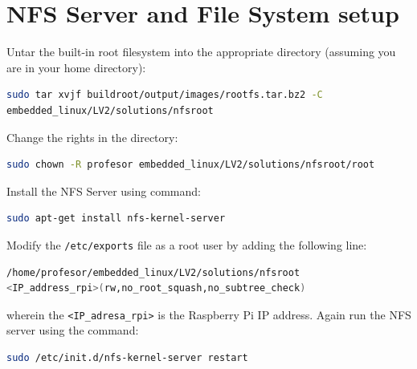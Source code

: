 \documentclass[11pt]{article}
\begin{document}
\section{NFS Server and File System setup}
Untar the built-in root filesystem into the appropriate directory (assuming you
 are in your home directory):
\begin{lstlisting}[language=bash]
sudo tar xvjf buildroot/output/images/rootfs.tar.bz2 -C
embedded_linux/LV2/solutions/nfsroot
\end{lstlisting}
Change the rights in the directory:
\begin{lstlisting}[language=bash]
sudo chown -R profesor embedded_linux/LV2/solutions/nfsroot/root
\end{lstlisting}
Install the NFS Server using command:
\begin{lstlisting}[language=bash]
sudo apt-get install nfs-kernel-server
\end{lstlisting}
Modify the \texttt{/etc/exports} file as a root user by adding the following
 line:
\begin{lstlisting}[language=bash]
/home/profesor/embedded_linux/LV2/solutions/nfsroot
<IP_address_rpi>(rw,no_root_squash,no_subtree_check)
\end{lstlisting}
wherein the \texttt{<IP\_adresa\_rpi>} is the Raspberry Pi IP address. Again
run the NFS server using the command:
\begin{lstlisting}[language=bash]
sudo /etc/init.d/nfs-kernel-server restart
\end{lstlisting}
\end{document}

